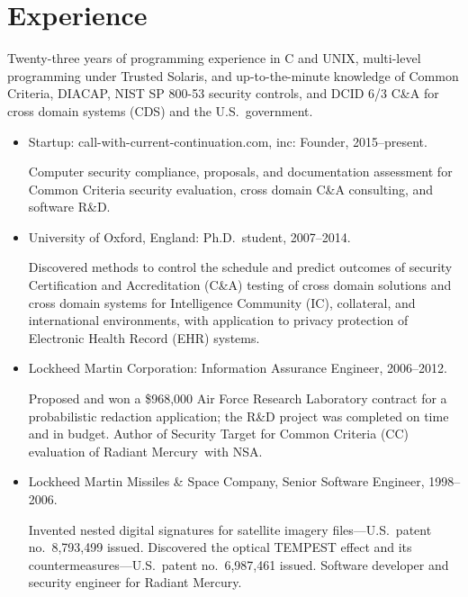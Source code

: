 \section*{Experience}

\vspace{-2mm}
Twenty-three years of programming experience in C and UNIX, multi-level
programming under Trusted Solaris, and
up-to-the-minute knowledge of Common Criteria, DIACAP, NIST SP 800-53
security controls, and DCID 6/3 C\&A for cross domain systems (CDS)
and the U.S.\ government.

\begin{itemize}
    \item Startup: call-with-current-continuation.com, inc: Founder, 2015--present.
        \vspace{-2mm}
        \begin{myquote}
            Computer security compliance, proposals, and
            documentation assessment for Common Criteria security
            evaluation, cross domain C\&A consulting, and software
            R\&D.
        \end{myquote}

	\item University of Oxford, England: Ph.D.\ student, 2007--2014.
        \vspace{-2mm}
		\begin{myquote}
            Discovered methods to control the schedule and predict
            outcomes of security Certification and Accreditation (C\&A)
            testing of cross domain solutions and cross domain systems for
            Intelligence Community (IC), collateral, and international
            environments, with application to privacy protection
            of Electronic Health Record (EHR) systems.
		\end{myquote}

	\item Lockheed Martin Corporation: Information Assurance Engineer, 2006--2012.
		\vspace{-2mm}
		\begin{myquote}
            Proposed and won a \$968,000 Air Force Research Laboratory
            contract for a probabilistic redaction application; the
            R\&D project was completed on time and in budget. Author of
            Security Target for Common Criteria (CC) evaluation of Radiant
            Mercury\rmtrademark\ with NSA.
		\end{myquote}

	\item Lockheed Martin Missiles \& Space Company, Senior Software Engineer, 1998--2006.
		\vspace{-2mm}
		\begin{myquote}
            Invented nested digital signatures for satellite imagery
            files---U.S.\ patent no.~8,793,499 issued. Discovered the
            optical TEMPEST effect and its countermeasures---U.S.\ patent
            no.~6,987,461 issued. Software developer and security engineer
            for Radiant Mercury\rmtrademark.
		\end{myquote}


\end{itemize}
